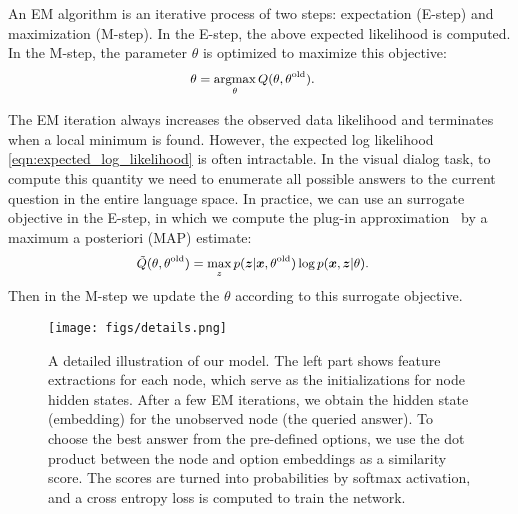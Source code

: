 \documentclass[10pt,twocolumn,letterpaper]{article}
\DeclareMathOperator*{\argmax}{argmax}
\begin{document}
An EM algorithm is an iterative process of two steps: expectation (E-step) and maximization (M-step). In the E-step, the above expected likelihood is computed. In the M-step, the parameter $\theta$ is optimized to maximize this objective:
\begin{equation}\small
\begin{aligned}
\theta &= \argmax_{\theta} Q(\theta, \theta^{\text{old}}).
\end{aligned}
\end{equation}

The EM iteration always increases the observed data likelihood and terminates when a local minimum is found. However, the expected log likelihood \autoref{eqn:expected_log_likelihood} is often intractable. In the visual dialog task, to compute this quantity we need to enumerate all possible answers to the current question in the entire language space. In practice, we can use an surrogate objective in the E-step, in which we compute the plug-in approximation~\cite{van2000asymptotic} by a maximum a posteriori (MAP) estimate:
\vspace{-2pt}
\begin{equation}\small
\begin{aligned}
\tilde{Q}(\theta, \theta^{\text{old}}) &= \max_z p(\bm{z} | \bm{x}, \theta^{\text{old}}) \log p(\bm{x}, \bm{z} | \theta).
\end{aligned}
\label{eqn:Q_surrogate}
\vspace{-2pt}
\end{equation}
Then in the M-step we update the $\theta$ according to this surrogate objective.

\begin{figure*}[t]
\centering
      \texttt{[image: figs/details.png]}
\caption{\small A detailed illustration of our model. The left part shows feature extractions for each node, which serve as the initializations for node hidden states. After a few EM iterations, we obtain the hidden state (embedding) for the unobserved node (the queried answer). To choose the best answer from the pre-defined options, we use the dot product between the node and option embeddings as a similarity score. The scores are turned into probabilities by softmax activation, and a cross entropy loss is computed to train the network.}
\label{fig:details}
\vspace{-12pt}
\end{figure*}
\end{document}
